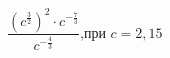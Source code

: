 \begin{ex}[type=simplify_calculate]
	\begin{condition}
		\( \dfrac{\left( c^{\frac{3}{2}} \right)^2\cdot c^{-\frac{7}{3}}}{c^{-\frac{4}{3}}} \),\quad при \( c=2,15 \)
	\end{condition}
\end{ex}